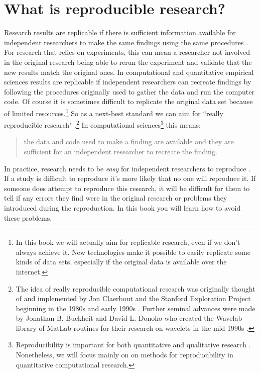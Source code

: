 \section{What is reproducible research?}

Research results are replicable if there is sufficient information available for independent researchers to make the same findings using the same procedures \cite[444]{King1995}. For research that relies on experiments, this can mean a researcher not involved in the original research being able to rerun the experiment and validate that the new results match the original ones. In computational and quantitative empirical sciences results are replicable if independent researchers can recreate findings by following the procedures originally used to gather the data and run the computer code. Of course it is sometimes difficult to replicate the original data set because of limited resources.\footnote{In this book we will actually aim for replicable research, even if we don't always achieve it. New technologies make it possible to easily replicate some kinds of data sets, especially if the original data is available over the internet.} So as a next-best standard we can aim for ``really reproducible research" \cite[1226]{Peng2011}.\footnote{The idea of really reproducible computational research was originally thought of and implemented by Jon Claerbout and the Stanford Exploration Project beginning in the 1980s and early 1990s \cite[]{Fomel2009,Donoho2009}. Further seminal advances were made by Jonathan B. Buckheit and David L. Donoho who created the Wavelab library of MatLab routines for their research on wavelets in the mid-1990s \cite[]{Buckheit1995}.} In computational sciences\footnote{Reproducibility is important for both quantitative and qualitative research \cite[]{King1994}. Nonetheless, we will focus mainly on on methods for reproducibility in quantitative computational research.} this means:

\begin{quote}
    the data and code used to make a finding are available and they are sufficient for an independent researcher to recreate the finding.
\end{quote} 

In practice, research needs to be {\emph{easy}} for independent researchers to reproduce \cite[]{Ball2012}. If a study is difficult to reproduce it's more likely that no one will reproduce it. If someone does attempt to reproduce this research, it will be difficult for them to tell if any errors they find were in the original research or problems they introduced during the reproduction. In this book you will learn how to avoid these problems. 

